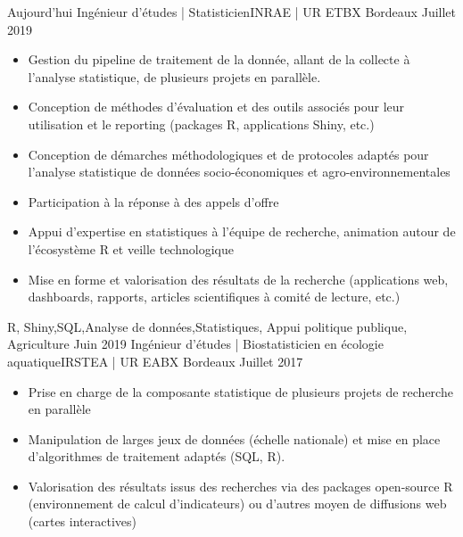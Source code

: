 \documentclass[localFont,alternative]{yaac-another-awesome-cv}
\begin{document}
\begin{experiences}
\experience
    {Aujourd'hui}   {Ingénieur d'études | Statisticien}{INRAE | UR ETBX }{Bordeaux}
    {Juillet 2019} {
                      \begin{itemize}                    
                        \item Gestion du pipeline de traitement de la donnée, allant de la collecte à l'analyse statistique, de plusieurs projets en parallèle.
                        \item Conception de méthodes d'évaluation et des outils associés pour leur utilisation et le reporting (packages R, applications Shiny, etc.)
                        \item Conception de démarches méthodologiques et de protocoles adaptés pour l’analyse statistique de données socio-économiques et agro-environnementales
                        \item Participation à la réponse à des appels d’offre
                        \item Appui d'expertise en statistiques à l'équipe de recherche, animation autour de l'écosystème R et veille technologique                                                                         
                        \item Mise en forme et valorisation des résultats de la recherche (applications web, dashboards, rapports, articles scientifiques à comité de lecture, etc.)
                      \end{itemize}
                    }
                    {R, Shiny,SQL,Analyse de données,Statistiques, Appui politique publique, Agriculture}
  \emptySeparator
  \experience
    {Juin 2019}   {Ingénieur d'études | Biostatisticien en écologie aquatique}{IRSTEA | UR EABX }{Bordeaux}
    {Juillet 2017} {
                      \begin{itemize}                    
                        \item Prise en charge de la composante statistique de plusieurs projets de recherche en parallèle
                        \item Manipulation de larges jeux de données (échelle nationale) et mise en place d'algorithmes de traitement adaptés (SQL, R).
                        \item Valorisation des résultats issus des recherches via des packages open-source R (environnement de calcul d'indicateurs) ou d'autres moyen de diffusions web (cartes interactives)

\end{itemize}}
\end{experiences}
\end{document}
